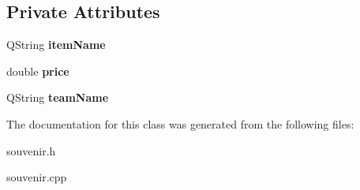 \subsection*{Private Attributes}
\begin{DoxyCompactItemize}
\item 
\mbox{\label{class_souvenir_adbd556e3c1c0404bf71ea1d87100c091}} 
Q\+String {\bfseries item\+Name}
\item 
\mbox{\label{class_souvenir_a2991e814ee69fba3a86d90b7ea48cb2b}} 
double {\bfseries price}
\item 
\mbox{\label{class_souvenir_a134e714c71e99d082304e0e332d5ce0d}} 
Q\+String {\bfseries team\+Name}
\end{DoxyCompactItemize}


The documentation for this class was generated from the following files\+:\begin{DoxyCompactItemize}
\item 
souvenir.\+h\item 
souvenir.\+cpp\end{DoxyCompactItemize}
